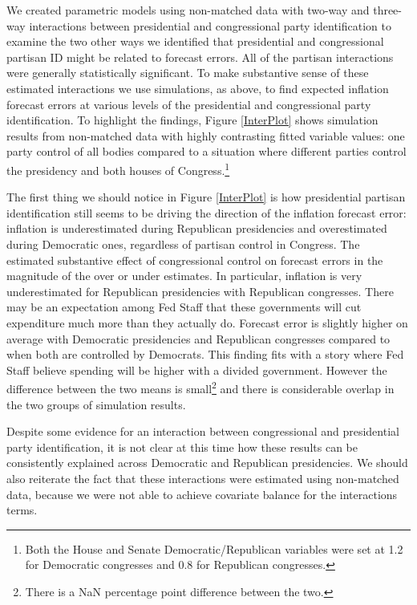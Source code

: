 \documentclass[a4paper]{article}\usepackage{graphicx, color}
\begin{document}
We created parametric models using non-matched data with two-way and three-way interactions between presidential and congressional party identification to examine the two other ways we identified that presidential and congressional partisan ID might be related to forecast errors. All of the partisan interactions were generally statistically significant. To make substantive sense of these estimated interactions we use simulations, as above, to find expected inflation forecast errors at various levels of the presidential and congressional party identification. To highlight the findings, Figure \ref{InterPlot} shows simulation results from non-matched data with highly contrasting fitted variable values: one party control of all bodies compared to a situation where different parties control the presidency and both houses of Congress.\footnote{Both the House and Senate Democratic/Republican variables were set at 1.2 for Democratic congresses and 0.8 for Republican congresses.} 

The first thing we should notice in Figure \ref{InterPlot} is how presidential partisan identification still seems to be driving the direction of the inflation forecast error: inflation is underestimated during Republican presidencies and overestimated during Democratic ones, regardless of partisan control in Congress. The estimated substantive effect of congressional control on forecast errors in the magnitude of the over or under estimates. In particular, inflation is very underestimated for Republican presidencies with Republican congresses. There may be an expectation among Fed Staff that these governments will cut expenditure much more than they actually do. Forecast error is slightly higher on average with Democratic presidencies and Republican congresses compared to when both are controlled by Democrats. This finding fits with a story where Fed Staff believe spending will be higher with a divided government. However the difference between the two means is small\footnote{There is a NaN percentage point difference between the two.} and there is considerable overlap in the two groups of simulation results.

Despite some evidence for an interaction between congressional and presidential party identification, it is not clear at this time how these results can be consistently explained across Democratic and Republican presidencies. We should also reiterate the fact that these interactions were estimated using non-matched data, because we were not able to achieve covariate balance for the interactions terms.
\end{document}
